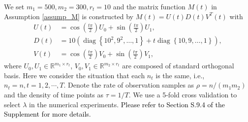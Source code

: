\documentclass[12pt]{article}
\newcommand{\oldchange}[1]{\textcolor{black}{#1}}
\begin{document}
  We set $m_1=500,m_2=300,r_t=10$ and the matrix function $M(t)$ in Assumption \ref{assump_M} is constructed by $M(t)=U(t)D(t)V^T(t)$ with
  \begin{align*}
  U(t) &= \cos\left(\frac{t\pi}{2}\right)U_0 + \sin\left(\frac{t\pi}{2}\right)U_1,\\
  D(t) &= 10 \left(\operatorname{diag}\left\{10^2,9^2,\dots,1\right\}+ t\operatorname{diag}\left\{10,9,\dots,1\right\}\right),\\
  V(t) &= \cos\left(\frac{t\pi}{2}\right)V_0+\sin\left(\frac{t\pi}{2}\right)V_1,
  \end{align*}
  where $U_0,U_1\in \mathbb{R}^{m_1\times r_t}$, $V_0,V_1\in \mathbb{R}^{m_2\times r_t}$ are composed of standard orthogonal basis. Here we consider the situation that each $n_t$ is the same, i.e., $n_t=n,t=1,2,\cdots,T$. Denote the rate of observation samples as $\rho= n/(m_1m_2)$ and the density of time points as $\tau=1/T$. We use a 5-fold cross validation to select $\lambda$ in the numerical experiments. \oldchange{Please refer to  Section S.9.4 of the Supplement for more details.}
\end{document}
